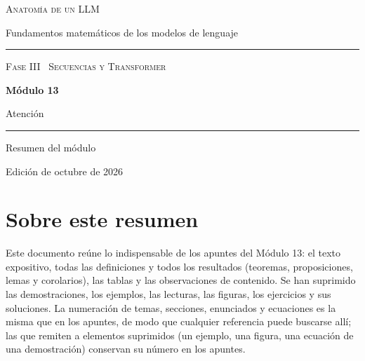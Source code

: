 \documentclass[11pt,a4paper,twoside,openany]{book}
\begin{document}
\frontmatter
\begin{titlepage}
\centering
\vspace*{2.5cm}
{\large\scshape Anatomía de un LLM}\par
\vspace{0.4cm}
{\normalsize Fundamentos matemáticos de los modelos de lenguaje}\par
\vspace{2.2cm}
\rule{\textwidth}{0.8pt}\par\vspace{0.5cm}
{\small\scshape Fase III \textperiodcentered\ Secuencias y Transformer}\par\vspace{0.3cm}
{\Huge\bfseries Módulo 13\par}\vspace{0.3cm}
{\LARGE Atención\par}
\vspace{0.5cm}\rule{\textwidth}{0.4pt}\par
\vspace{1.6cm}
{\large Resumen del módulo}\par
\vfill
{\small Edición de octubre de 2026}\par
\end{titlepage}

\chapter*{Sobre este resumen}

Este documento reúne lo indispensable de los apuntes del Módulo 13: el texto expositivo, todas las definiciones y todos los resultados (teoremas, proposiciones, lemas y corolarios), las tablas y las observaciones de contenido. Se han suprimido las demostraciones, los ejemplos, las lecturas, las figuras, los ejercicios y sus soluciones. La numeración de temas, secciones, enunciados y ecuaciones es la misma que en los apuntes, de modo que cualquier referencia puede buscarse allí; las que remiten a elementos suprimidos (un ejemplo, una figura, una ecuación de una demostración) conservan su número en los apuntes.
\end{document}
